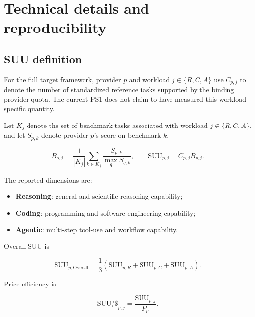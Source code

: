 \documentclass[sigconf,nonacm]{acmart}
\begin{document}

\appendix

\section{Technical details and reproducibility}

\subsection{SUU definition}

For the full target framework, provider $p$ and workload
$j\in\{R,C,A\}$ use $C_{p,j}$ to denote the number of standardized reference
tasks supported by the binding provider quota. The current PS1 does not claim
to have measured this workload-specific quantity.

Let $K_j$ denote the set of benchmark tasks associated with workload
$j\in\{R,C,A\}$, and let $S_{p,k}$ denote provider $p$'s score on benchmark
$k$.

\[
B_{p,j}
=
\frac{1}{|K_j|}
\sum_{k\in K_j}
\frac{S_{p,k}}
{\max_q S_{q,k}},
\qquad
\mathrm{SUU}_{p,j}
=
C_{p,j}B_{p,j}.
\]

\vspace{0.4em}

The reported dimensions are:

\begin{itemize}

\item
\textbf{Reasoning}:
general and scientific-reasoning capability;

\item
\textbf{Coding}:
programming and software-engineering capability;

\item
\textbf{Agentic}:
multi-step tool-use and workflow capability.

\end{itemize}

Overall SUU is

\[
\mathrm{SUU}_{p,\mathrm{Overall}}
=
\frac{1}{3}
\left(
\mathrm{SUU}_{p,R}
+
\mathrm{SUU}_{p,C}
+
\mathrm{SUU}_{p,A}
\right).
\]

Price efficiency is

\[
\mathrm{SUU/\$}_{p,j}
=
\frac{\mathrm{SUU}_{p,j}}{P_p}.
\]

\vspace{0.4em}
\end{document}
